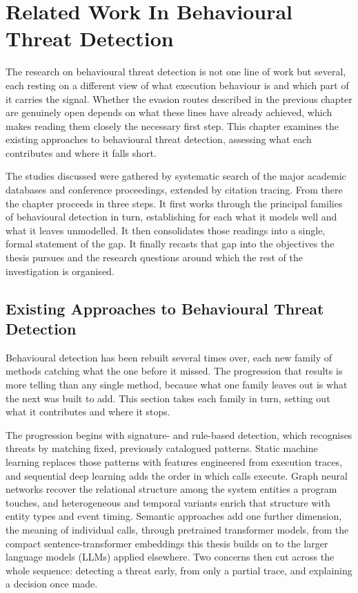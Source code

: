 \documentclass[%
    BCOR=10mm,
    DIV=13,
    toc=bibliography,
    toc=listof,
    oneside,
    12pt,
]{scrbook}
\begin{document}
\chapter{Related Work In Behavioural Threat Detection}
\label{chap:literature}

The research on behavioural threat detection is not one line of work but several,
each resting on a different view of what execution behaviour is and which part of it
carries the signal. Whether the evasion routes described in the previous chapter are
genuinely open depends on what these lines have already achieved, which makes reading
them closely the necessary first step. This chapter examines the existing approaches
to behavioural threat detection, assessing what each contributes and where it falls
short.

The studies discussed were gathered by systematic search of the major academic
databases and conference proceedings, extended by citation tracing. From there the
chapter proceeds in three steps. It first works through the principal families of
behavioural detection in turn, establishing for each what it models well and what it
leaves unmodelled. It then consolidates those readings into a single, formal
statement of the gap. It finally recasts that gap into the objectives the thesis
pursues and the research questions around which the rest of the investigation is
organised.

\section{Existing Approaches to Behavioural Threat Detection}
\label{sec:existing_studies}

Behavioural detection has been rebuilt several times over, each new family of
methods catching what the one before it missed. The progression that results
is more telling than any single method, because what one family leaves out is
what the next was built to add. This section takes each family in turn,
setting out what it contributes and where it stops.

The progression begins with signature- and rule-based detection, which
recognises threats by matching fixed, previously catalogued patterns. Static
machine learning replaces those patterns with features engineered from
execution traces, and sequential deep learning adds the order in which calls
execute. Graph neural networks recover the relational structure among the
system entities a program touches, and heterogeneous and temporal variants
enrich that structure with entity types and event timing. Semantic approaches
add one further dimension, the meaning of individual calls, through pretrained
transformer models, from the compact sentence-transformer embeddings this
thesis builds on to the larger language models (LLMs) applied elsewhere. Two
concerns then cut across the whole sequence: detecting a threat early, from
only a partial trace, and explaining a decision once made.
\end{document}
